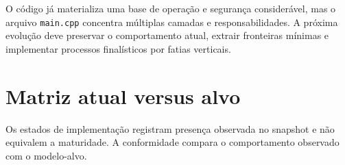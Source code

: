\documentclass[11pt,a4paper,oneside]{article}
\begin{document}
\begin{alerta}
O código já materializa uma base de operação e segurança considerável, mas o arquivo \texttt{main.cpp} concentra múltiplas camadas e responsabilidades. A próxima evolução deve preservar o comportamento atual, extrair fronteiras mínimas e implementar processos finalísticos por fatias verticais.
\end{alerta}

\section{Matriz atual versus alvo}

Os estados de implementação registram presença observada no snapshot e não equivalem a maturidade. A conformidade compara o comportamento observado com o modelo-alvo.
\end{document}

